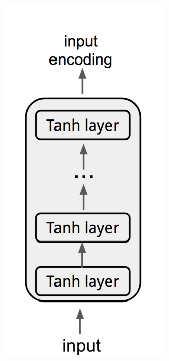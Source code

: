 \begin{figure}
	\captionsetup[subfigure]{justification=centering}
	\centering
	\begin{subfigure}[b]{.35\textwidth}
		\centering
		\includegraphics[width=\textwidth]{figures/semantic_textual_similarity/sentence_encoders/dan.png}

\end{subfigure}
\end{figure}
